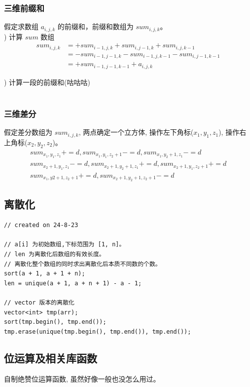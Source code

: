 \documentclass[a4paper,12pt]{article}
\begin{document}
\subsubsection{三维前缀和}
\noindent 假定求数组 $a_{i,j,k}$ 的前缀和，前缀和数组为 $sum_{i,j,k}$。\\

) 计算 $sum$ 数组
\begin{align*}
sum_{i,j,k} &= + sum_{i-1,j,k} + sum_{i,j-1,k} + sum_{i,j,k-1} \\
            &= - sum_{i-1,j-1,k} - sum_{i-1,j,k-1} - sum_{i,j-1,k-1} \\
            &= + sum_{i-1,j-1,k-1} + a_{i,j,k}
\end{align*}

) 计算一段的前缀和(咕咕咕) \\ \\

\subsubsection{三维差分}
\noindent 假定差分数组为 $sum_{i,j,k}$, 两点确定一个立方体, 
操作左下角标($x_1,y_1,z_1$), 操作右上角标($x_2,y_2,z_2$)。 \\
\begin{gather*}
sum_{x_1,y_1,z_1}+=d,sum_{x_1,y_1,z_2+1}-=d,sum_{x_1,y_2+1,z_1}-=d\\
sum_{x_2+1,y_1,z_1}-=d,sum_{x_2+1,y_2+1,z_1}+=d,sum_{x_2+1,y_1,z_2+1}+=d\\
sum_{x_1,y2+1,z_2+1}+=d,sum_{x_2+1,y_2+1,z_2+1}-=d
\end{gather*}

\subsection{离散化}
\begin{lstlisting}
// created on 24-8-23

// a[i] 为初始数组,下标范围为 [1, n]。
// len 为离散化后数组的有效长度。
// 离散化整个数组的同时求出离散化后本质不同数的个数。
sort(a + 1, a + 1 + n);
len = unique(a + 1, a + n + 1) - a - 1;

// vector 版本的离散化
vector<int> tmp(arr);
sort(tmp.begin(), tmp.end());
tmp.erase(unique(tmp.begin(), tmp.end()), tmp.end());
\end{lstlisting}

\subsection{位运算及相关库函数}
\noindent 自制绝赞位运算函数, 虽然好像一般也没怎么用过。 
\end{document}
